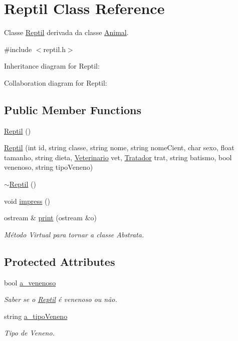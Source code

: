 \hypertarget{classReptil}{}\section{Reptil Class Reference}
\label{classReptil}


Classe \hyperlink{classReptil}{Reptil} derivada da classe \hyperlink{classAnimal}{Animal}.  




{\ttfamily \#include $<$reptil.\+h$>$}



Inheritance diagram for Reptil\+:


Collaboration diagram for Reptil\+:
\subsection*{Public Member Functions}
\begin{DoxyCompactItemize}
\item 
\hyperlink{classReptil_a8d4e391e335678b7ed64eda95e050553}{Reptil} ()
\item 
\hyperlink{classReptil_a9684945c567d59b4898b3b102823d910}{Reptil} (int id, string classe, string nome, string nome\+Cient, char sexo, float tamanho, string dieta, \hyperlink{classVeterinario}{Veterinario} vet, \hyperlink{classTratador}{Tratador} trat, string batismo, bool venenoso, string tipo\+Veneno)
\item 
\hyperlink{classReptil_a826ed679cc45f74fefecef7d4d40b409}{$\sim$\+Reptil} ()
\item 
void \hyperlink{classReptil_aa0e5c9f9397a5f0670915f8de3d7c468}{impress} ()
\item 
ostream \& \hyperlink{classReptil_a18885dbd48b1fced7f911f8ebabb58e4}{print} (ostream \&o)
\begin{DoxyCompactList}\small\item\em Método Virtual para tornar a classe Abstrata. \end{DoxyCompactList}\end{DoxyCompactItemize}
\subsection*{Protected Attributes}
\begin{DoxyCompactItemize}
\item 
bool \hyperlink{classReptil_ab2ebc4cb4f0cf56587b59fdb0d130cf5}{a\+\_\+venenoso}
\begin{DoxyCompactList}\small\item\em Saber se o \hyperlink{classReptil}{Reptil} é venenoso ou não. \end{DoxyCompactList}\item 
string \hyperlink{classReptil_ac9ca9b337ca21b72b0ef77b3904b56b7}{a\+\_\+tipo\+Veneno}
\begin{DoxyCompactList}\small\item\em Tipo de Veneno. \end{DoxyCompactList}\end{DoxyCompactItemize}


